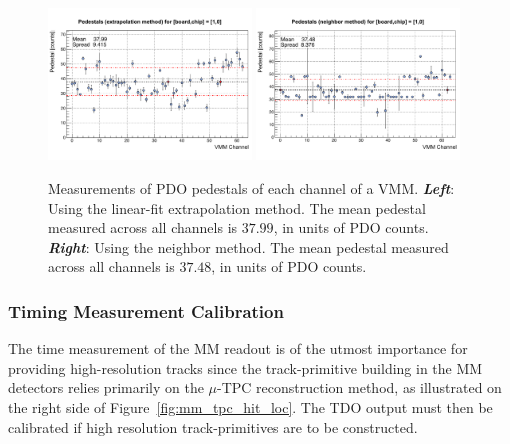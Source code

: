 \begin{figure}[!htb]
    \begin{center}
        \includegraphics[width=0.48\textwidth]{figures/nsw/calibration/vmm_pedestals_extrap}
        \includegraphics[width=0.48\textwidth]{figures/nsw/calibration/vmm_pedestals_neighbor}
        \caption{
            Measurements of PDO pedestals of each channel of a VMM.
            \textbf{\textit{Left}}: Using the linear-fit extrapolation method.
                The mean pedestal measured across all channels is $37.99$, in units of PDO counts.
            \textbf{\textit{Right}}: Using the neighbor method.
                The mean pedestal measured across all channels is $37.48$, in units of PDO counts.
        }
        \label{fig:pedestals}
    \end{center}
\end{figure}

\subsubsection{Timing Measurement Calibration}
\label{sec:calib_tod}

The time measurement of the MM readout is of the utmost importance for providing
high-resolution tracks since the track-primitive building in the MM detectors
relies primarily on the $\mu$-TPC reconstruction method, as illustrated on the right side of Figure~\ref{fig:mm_tpc_hit_loc}.
The TDO output must then be calibrated if high resolution track-primitives are to
be constructed.

